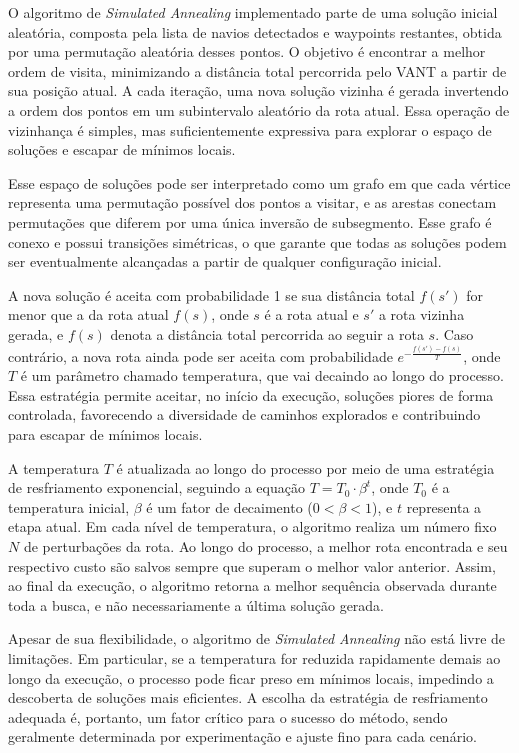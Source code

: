 O algoritmo de \textit{Simulated Annealing} implementado parte de uma solução inicial aleatória, composta pela lista de navios detectados e waypoints restantes, obtida por uma permutação aleatória desses pontos. O objetivo é encontrar a melhor ordem de visita, minimizando a distância total percorrida pelo VANT a partir de sua posição atual. A cada iteração, uma nova solução vizinha é gerada invertendo a ordem dos pontos em um subintervalo aleatório da rota atual. Essa operação de vizinhança é simples, mas suficientemente expressiva para explorar o espaço de soluções e escapar de mínimos locais.

Esse espaço de soluções pode ser interpretado como um grafo em que cada vértice representa uma permutação possível dos pontos a visitar, e as arestas conectam permutações que diferem por uma única inversão de subsegmento. Esse grafo é conexo e possui transições simétricas, o que garante que todas as soluções podem ser eventualmente alcançadas a partir de qualquer configuração inicial.

A nova solução é aceita com probabilidade 1 se sua distância total $f(s')$ for menor que a da rota atual $f(s)$, onde $s$ é a rota atual e $s'$ a rota vizinha gerada, e $f(s)$ denota a distância total percorrida ao seguir a rota $s$. Caso contrário, a nova rota ainda pode ser aceita com probabilidade $e^{-\frac{f(s') - f(s)}{T}}$, onde $T$ é um parâmetro chamado temperatura, que vai decaindo ao longo do processo. Essa estratégia permite aceitar, no início da execução, soluções piores de forma controlada, favorecendo a diversidade de caminhos explorados e contribuindo para escapar de mínimos locais.

A temperatura $T$ é atualizada ao longo do processo por meio de uma estratégia de resfriamento exponencial, seguindo a equação $T = T_0 \cdot \beta^t$, onde $T_0$ é a temperatura inicial, $\beta$ é um fator de decaimento ($0 < \beta < 1$), e $t$ representa a etapa atual. Em cada nível de temperatura, o algoritmo realiza um número fixo $N$ de perturbações da rota. Ao longo do processo, a melhor rota encontrada e seu respectivo custo são salvos sempre que superam o melhor valor anterior. Assim, ao final da execução, o algoritmo retorna a melhor sequência observada durante toda a busca, e não necessariamente a última solução gerada.

Apesar de sua flexibilidade, o algoritmo de \textit{Simulated Annealing} não está livre de limitações. Em particular, se a temperatura for reduzida rapidamente demais ao longo da execução, o processo pode ficar preso em mínimos locais, impedindo a descoberta de soluções mais eficientes. A escolha da estratégia de resfriamento adequada é, portanto, um fator crítico para o sucesso do método, sendo geralmente determinada por experimentação e ajuste fino para cada cenário.

